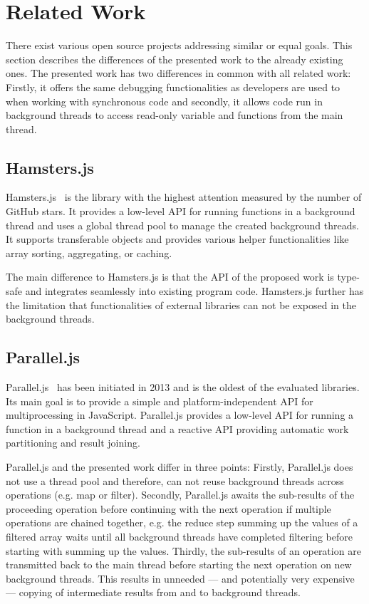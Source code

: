 \section{Related Work}\label{sec:related-work}
There exist various open source projects addressing similar or equal goals. This section describes the differences of the presented work to the already existing ones. The presented work has two differences in common with all related work: Firstly, it offers the same debugging functionalities as developers are used to when working with synchronous code and secondly, it allows code run in background threads to access read-only variable and functions from the main thread.

\subsection{Hamsters.js}
Hamsters.js~\cite{hamstersjs} is the library with the highest attention measured by the number of GitHub stars. It provides a low-level API for running functions in a background thread and uses a global thread pool to manage the created background threads. It supports transferable objects and provides various helper functionalities like array sorting, aggregating, or caching.

The main difference to Hamsters.js is that the API of the proposed work is type-safe and integrates seamlessly into existing program code. Hamsters.js further has the limitation that functionalities of external libraries can not be exposed in the background threads.

\subsection{Parallel.js}
Parallel.js~\cite{SavitzkyMayr2016} has been initiated in 2013 and is the oldest of the evaluated libraries. Its main goal is to provide a simple and platform-independent API for multiprocessing in JavaScript. Parallel.js provides a low-level API for running a function in a background thread and a reactive API providing automatic work partitioning and result joining. 

Parallel.js and the presented work differ in three points:
Firstly, Parallel.js does not use a thread pool and therefore, can not reuse background threads across operations (e.g. map or filter). Secondly, Parallel.js awaits the sub-results of the proceeding operation before continuing with the next operation if multiple operations are chained together, e.g. the reduce step summing up the values of a filtered array waits until all background threads have completed filtering before starting with summing up the values. Thirdly, the sub-results of an operation are transmitted back to the main thread before starting the next operation on new background threads. This results in unneeded --- and potentially very expensive --- copying of intermediate results from and to background threads.


